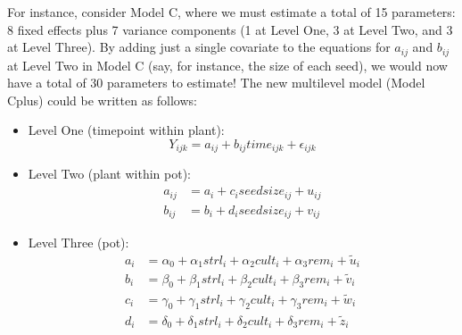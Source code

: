 \documentclass[
]{krantz}
\providecommand{\tightlist}{%
  \setlength{\itemsep}{0pt}\setlength{\parskip}{0pt}}
\begin{document}
For instance, consider Model C, where we must estimate a total of 15 parameters: 8 fixed effects plus 7 variance components (1 at Level One, 3 at Level Two, and 3 at Level Three). By adding just a single covariate to the equations for \(a_{ij}\) and \(b_{ij}\) at Level Two in Model C (say, for instance, the size of each seed), we would now have a total of 30 parameters to estimate! The new multilevel model (Model Cplus) could be written as follows:

\begin{itemize}
\tightlist
\item
  Level One (timepoint within plant):
  \begin{equation}
  Y_{ijk} = a_{ij}+b_{ij}\textstyle{time}_{ijk}+\epsilon_{ijk}
  \label{eq:lev1timemodcp}
  \end{equation}
\item
  Level Two (plant within pot):
  \begin{align*}
  a_{ij} & = a_{i}+c_{i}\textstyle{seedsize}_{ij}+u_{ij} \\
  b_{ij} & = b_{i}+d_{i}\textstyle{seedsize}_{ij}+v_{ij}
  \end{align*}
\item
  Level Three (pot):
  \begin{align*}
  a_{i} & = \alpha_{0}+\alpha_{1}\textstyle{strl}_{i}+\alpha_{2}\textstyle{cult}_{i}+\alpha_{3}\textstyle{rem}_{i}+ \tilde{u}_{i}\\
  b_{i} & = \beta_{0}+\beta_{1}\textstyle{strl}_{i}+\beta_{2}\textstyle{cult}_{i}+\beta_{3}\textstyle{rem}_{i}+ \tilde{v}_{i} \\
  c_{i} & = \gamma_{0}+\gamma_{1}\textstyle{strl}_{i}+\gamma_{2}\textstyle{cult}_{i}+\gamma_{3}\textstyle{rem}_{i}+ \tilde{w}_{i} \\
  d_{i} & = \delta_{0}+\delta_{1}\textstyle{strl}_{i}+\delta_{2}\textstyle{cult}_{i}+\delta_{3}\textstyle{rem}_{i}+ \tilde{z}_{i}
  \end{align*}
\end{itemize}
\end{document}
